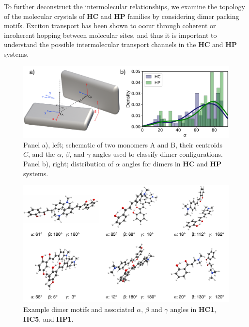 To further deconstruct the intermolecular relationships, we examine the topology of the molecular crystals of \textbf{HC} and \textbf{HP} families by considering dimer packing motifs. Exciton transport has been shown to occur through coherent or incoherent hopping between molecular sites, and thus it is important to understand the possible intermolecular transport channels in the \textbf{HC} and \textbf{HP} systems.

\begin{figure}
\centering
  \includegraphics[width=0.8\linewidth]{dimer_schematic_alpha}
  \caption[Schematic of $\alpha$, $\beta$, and $\gamma$ angles for classification of dimers.]{Panel a), left; schematic of two monomers A and B, their centroids $C$, and the $\alpha$, $\beta$, and $\gamma$ angles used to classify dimer configurations. Panel b), right; distribution of $\alpha$ angles for dimers in \textbf{HC} and \textbf{HP} systems.}
  \label{figure: dimer_schematic_alpha}
\end{figure}

\begin{figure}[H]
\centering
  \includegraphics[width=0.8\linewidth]{motif_examples}
  \caption[Example dimer motifs in \textbf{HC1}, \textbf{HC5}, and \textbf{HP1}.]{Example dimer motifs and associated $\alpha$, $\beta$ and $\gamma$ angles in \textbf{HC1}, \textbf{HC5}, and \textbf{HP1}.}
  \label{figure: motif_examples}
\end{figure}

